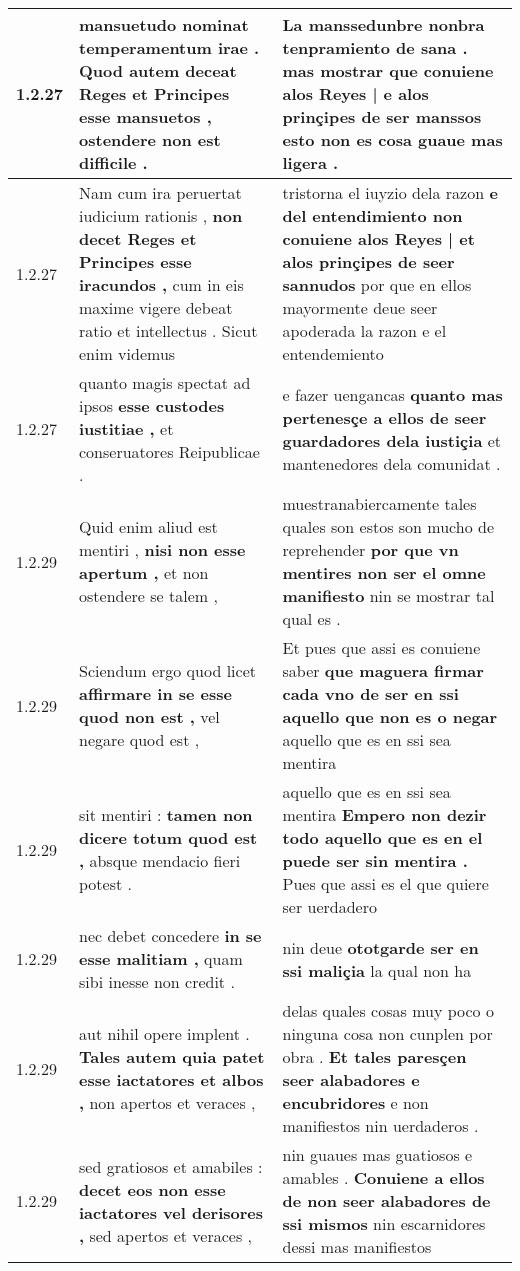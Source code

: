 \begin{tabular}{|p{1cm}|p{6.5cm}|p{6.5cm}|}
1.2.27 & mansuetudo nominat temperamentum irae . \textbf{ Quod autem deceat Reges et Principes esse mansuetos , } ostendere non est difficile . & La manssedunbre nonbra tenpramiento de sana . \textbf{ mas mostrar que conuiene alos Reyes | e alos prinçipes de ser manssos } esto non es cosa guaue mas ligera . \\\hline
1.2.27 & Nam cum ira peruertat iudicium rationis , \textbf{ non decet Reges et Principes esse iracundos , } cum in eis maxime vigere debeat ratio et intellectus . Sicut enim videmus & tristorna el iuyzio dela razon \textbf{ e del entendimiento non conuiene alos Reyes | et alos prinçipes de seer sannudos } por que en ellos mayormente deue seer apoderada la razon e el entendemiento \\\hline
1.2.27 & quanto magis spectat ad ipsos \textbf{ esse custodes iustitiae , } et conseruatores Reipublicae . & e fazer uengancas \textbf{ quanto mas pertenesçe a ellos de seer guardadores dela iustiçia } et mantenedores dela comunidat . \\\hline
1.2.29 & Quid enim aliud est mentiri , \textbf{ nisi non esse apertum , } et non ostendere se talem , & muestranabiercamente tales quales son estos son mucho de reprehender \textbf{ por que vn mentires non ser el omne manifiesto } nin se mostrar tal qual es . \\\hline
1.2.29 & Sciendum ergo quod licet \textbf{ affirmare in se esse quod non est , } vel negare quod est , & Et pues que assi es conuiene saber \textbf{ que maguera firmar cada vno de ser en ssi aquello que non es o negar } aquello que es en ssi sea mentira \\\hline
1.2.29 & sit mentiri : \textbf{ tamen non dicere totum quod est , } absque mendacio fieri potest . & aquello que es en ssi sea mentira \textbf{ Empero non dezir todo aquello que es en el puede ser sin mentira . } Pues que assi es el que quiere ser uerdadero \\\hline
1.2.29 & nec debet concedere \textbf{ in se esse malitiam , } quam sibi inesse non credit . & nin deue \textbf{ ototgarde ser en ssi maliçia } la qual non ha \\\hline
1.2.29 & aut nihil opere implent . \textbf{ Tales autem quia patet esse iactatores et albos , } non apertos et veraces , & delas quales cosas muy poco o ninguna cosa non cunplen por obra . \textbf{ Et tales paresçen seer alabadores e encubridores } e non manifiestos nin uerdaderos . \\\hline
1.2.29 & sed gratiosos et amabiles : \textbf{ decet eos non esse iactatores vel derisores , } sed apertos et veraces , & nin guaues mas guatiosos e amables . \textbf{ Conuiene a ellos de non seer alabadores de ssi mismos } nin escarnidores dessi mas manifiestos \\\hline

\end{tabular}
